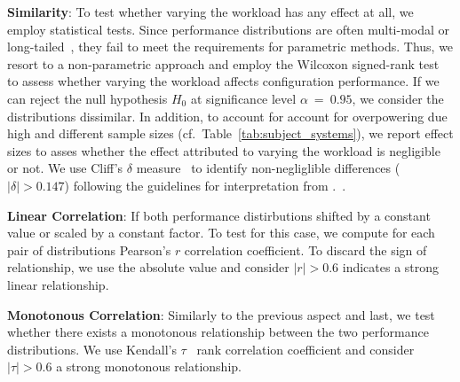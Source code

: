 \begin{compactenum}
	\item \textbf{Similarity}: To test whether varying the workload has any effect at all, we employ statistical tests. Since performance distributions are often multi-modal or long-tailed~\cite{curtsinger_stabilizer_2013,maricq2018taming}, they fail to meet the requirements for parametric methods. 
	Thus, we resort to a non-parametric approach and employ the Wilcoxon signed-rank test~\cite{lovric_international_2010} to assess whether varying the workload affects configuration performance. If we can reject the null hypothesis $H_0$ at significance level $\alpha~=~0.95$, we consider the distributions dissimilar. In addition, to account for account for overpowering due high and different sample sizes (cf.~Table~\ref{tab:subject_systems}), we report effect sizes to asses whether the effect attributed to varying the workload is negligible or not. We use Cliff's $\delta$ measure~\cite{Cliff1993DominanceSO} to identify non-negliglible differences ($\vert \delta \vert > 0.147$) following the guidelines for interpretation from \citeauthor{romano2006exploring}.~\cite{romano2006exploring}.
	
	\item \textbf{Linear Correlation}: If both performance distirbutions shifted by a constant value or scaled by a constant factor. To test for this case, we compute for each pair of distributions Pearson's $r$ correlation coefficient. To discard the sign of relationship, we use the absolute value and consider $\vert r\vert >0.6$ indicates a strong linear relationship. 
	\item \textbf{Monotonous Correlation}: Similarly to the previous aspect and last, we test whether there exists a monotonous relationship between the two performance distributions. We use Kendall's $\tau$~\cite{kendall1938new} rank correlation coefficient and consider $\vert\tau\vert > 0.6$ a strong monotonous relationship.
\end{compactenum}


